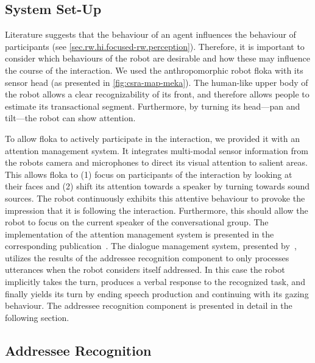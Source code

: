 \subsection{System Set-Up}
Literature suggests that the behaviour of an agent influences the behaviour of participants (see \cref{sec.rw.hi.focused-rw.perception}).
Therefore, it is important to consider which behaviours of the \gls{robot} are desirable and how these may influence the course of the interaction.
We used the anthropomorphic \gls{robot} \gls{floka} with its sensor head (as presented in \vref{fig:csra-map-meka}).
The human-like upper body of the \gls{robot} allows a clear recognizability of its front, and therefore allows people to estimate its \gls{transactional segment}.
Furthermore, by turning its head---pan and tilt---the \gls{robot} can show attention. 

To allow \gls{floka} to actively participate in the interaction, we pro\-vi\-ded it with an attention management system.
It integrates multi-modal sensor information from the \glspl{robot} camera and microphones to direct its visual attention to salient areas.
This allows \gls{floka} to (1) focus on participants of the interaction by looking at their faces and (2) shift its attention towards a \gls{speaker} by turning towards sound sources.
The \gls{robot} continuously exhibits this attentive behaviour to provoke the impression that it is following the interaction.
Furthermore, this should allow the \gls{robot} to focus on the current \gls{speaker} of the \gls{conversational group}.
The implementation of the attention management system is presented in the corresponding publication~\cite{Richter}.
The dialogue management system, presented by~, utilizes the results of the \gls{addressee} recognition component to only processes utterances when the \gls{robot} considers itself addressed.
In this case the \gls{robot} implicitly takes the \gls{turn}, produces a verbal response to the recognized task, and finally yields its \gls{turn} by ending speech production and continuing with its gazing behaviour.
The \gls{addressee} recognition component is presented in detail in the following section.

\subsection{Addressee Recognition}\label{sec.meka.study.classifiers}


